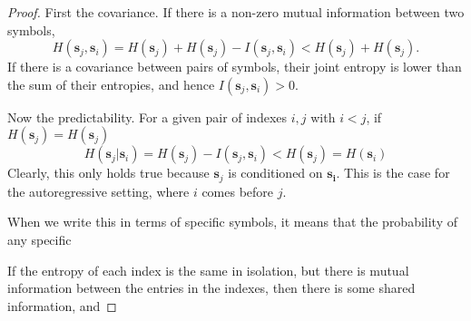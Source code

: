 \begin{proof}
%
First the covariance. If there is a non-zero mutual information between two symbols,
\begin{equation}
    H(\bm{s}_j, \bm{s}_i) 
    = H(\bm{s}_j)  + H(\bm{s}_j)  - I(\bm{s}_j, \bm{s}_i) 
    <  H(\bm{s}_j)  + H(\bm{s}_j).
\end{equation}
If there is a covariance between pairs of symbols, their joint entropy is lower than the sum of their entropies, and hence $I(\bm{s}_j, \bm{s}_i) >0$.

Now the predictability. For a given pair of indexes $i,j$ with $i<j$, if $H(\bm{s}_j)  = H(\bm{s}_j)$
\begin{equation}
    H(\bm{s}_j| \bm{s}_i)  =  H(\bm{s}_j) - I(\bm{s}_j, \bm{s}_i) <   H(\bm{s}_j) =  H(\bm{s}_i)  
\end{equation}
Clearly, this only holds true because $\bm{s}_j$ is conditioned on $\bm{s_i}$. This is the case for the autoregressive setting, where $i$ comes before $j$.

When we write this in terms of specific symbols, it means that the probability of any specific 

If the entropy of each index is the same in isolation, but there is mutual information between the entries in the indexes, then there is some shared information, and 
% 
\end{proof}